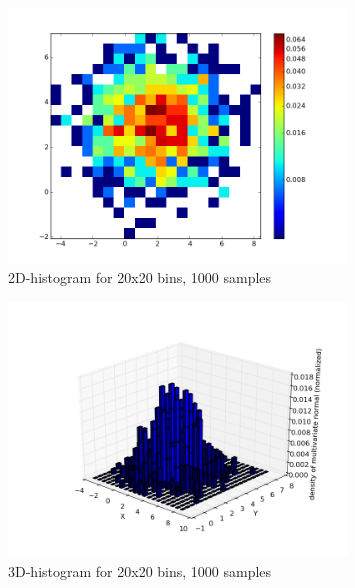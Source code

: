 \documentclass[11pt]{scrartcl} %
\begin{document}
                 \begin{figure}[ht]
	   \centering
           \includegraphics[width=0.8\textwidth, angle=0]{histogram_2D.png}
	   \caption{2D-histogram for 20x20 bins, 1000 samples}
	   \label{fig2}
                 \end{figure}
                 \begin{figure}[ht]
	   \centering
           \includegraphics[width=0.8\textwidth, angle=0]{histogram_3D.png}
	   \caption{3D-histogram for 20x20 bins, 1000 samples}
	   \label{fig3}
         \end{figure}
                 
\end{document}
